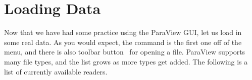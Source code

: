 

\section{Loading Data}


Now that we have had some practice using the ParaView GUI, let us load in
some real data.  As you would expect, the   command
is the first one off of the  menu, and there is also toolbar
button~ for opening a file.  ParaView supports many file
types, and the list grows as more types get added.  The following is a list
of currently available readers.


